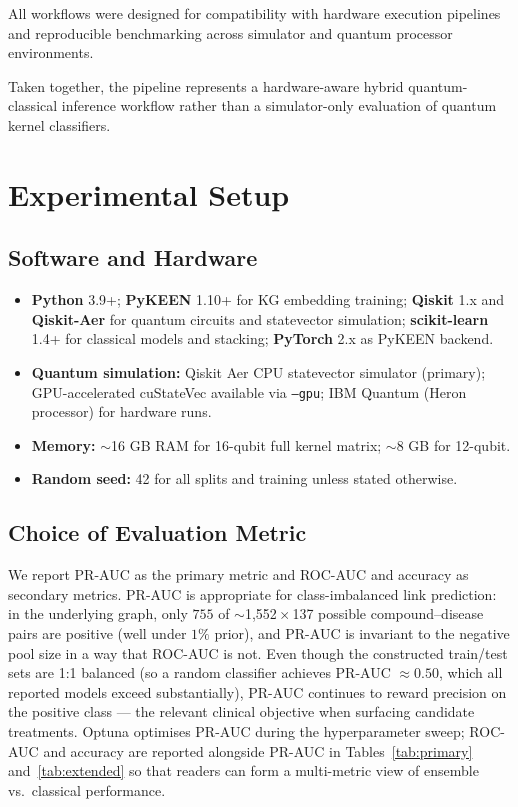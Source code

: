 \documentclass[10pt,twocolumn]{article}
\begin{document}
All workflows were designed for compatibility with hardware execution pipelines and reproducible benchmarking across simulator and quantum processor environments.

Taken together, the pipeline represents a hardware-aware hybrid quantum-classical inference workflow rather than a simulator-only evaluation of quantum kernel classifiers.

\section{Experimental Setup}

\subsection{Software and Hardware}

\begin{itemize}[leftmargin=*]
\item \textbf{Python} 3.9+; \textbf{PyKEEN} 1.10+ for KG embedding training; \textbf{Qiskit} 1.x and \textbf{Qiskit-Aer} for quantum circuits and statevector simulation; \textbf{scikit-learn} 1.4+ for classical models and stacking; \textbf{PyTorch} 2.x as PyKEEN backend.
\item \textbf{Quantum simulation:} Qiskit Aer CPU statevector simulator (primary); GPU-accelerated cuStateVec available via \texttt{--gpu}; IBM Quantum (Heron processor) for hardware runs.
\item \textbf{Memory:} ${\sim}$16 GB RAM for 16-qubit full kernel matrix; ${\sim}$8 GB for 12-qubit.
\item \textbf{Random seed:} 42 for all splits and training unless stated otherwise.
\end{itemize}

\subsection{Choice of Evaluation Metric}\label{sec:metric_choice}

We report PR-AUC as the primary metric and ROC-AUC and accuracy as secondary metrics. PR-AUC is appropriate for class-imbalanced link prediction: in the underlying graph, only $755$ of $\sim$1{,}552\,$\times$\,137 possible compound--disease pairs are positive (well under $1\%$ prior), and PR-AUC is invariant to the negative pool size in a way that ROC-AUC is not. Even though the constructed train/test sets are 1:1 balanced (so a random classifier achieves PR-AUC $\approx 0.50$, which all reported models exceed substantially), PR-AUC continues to reward precision on the positive class --- the relevant clinical objective when surfacing candidate treatments. Optuna optimises PR-AUC during the hyperparameter sweep; ROC-AUC and accuracy are reported alongside PR-AUC in Tables~\ref{tab:primary} and~\ref{tab:extended} so that readers can form a multi-metric view of ensemble vs.\ classical performance.
\end{document}
